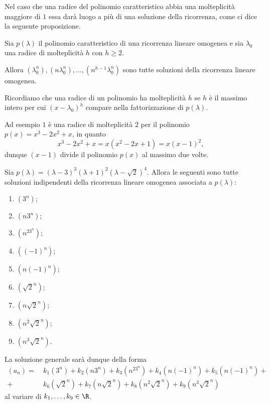 Nel caso che una radice del polinomio caratteristico abbia una molteplicità maggiore di $1$ essa darà luogo a più di una soluzione della ricorrenza, come ci dice la seguente proposizione.
\begin{proposition}
    Sia $p(\lambda)$ il polinomio caratteristico di una ricorrenza lineare omogenea e sia $\lambda_0$ una radice di molteplicità $h$ con $h \geq 2$. 
    
    Allora $(\lambda_0^n), (n\lambda_0^n), \dots, (n^{h-1}\lambda_0^n)$ sono tutte soluzioni della ricorrenza lineare omogenea.
\end{proposition}

\begin{remark}
    Ricordiamo che una radice di un polinomio ha molteplicità $h$ se $h$ è il massimo intero per cui $(x - \lambda_0)^h$ compare nella fattorizzazione di $p(\lambda)$.

    Ad esempio $1$ è una radice di molteplicità $2$ per il polinomio $p(x) = x^3 - 2x^2 + x$, in quanto \[
        x^3 - 2x^2 + x = x(x^2 - 2x + 1) = x(x-1)^2,
    \] dunque $(x-1)$ divide il polinomio $p(x)$ al massimo due volte.
\end{remark}

\begin{example}
    Sia $p(\lambda) = (\lambda - 3)^3(\lambda + 1)^2(\lambda - \sqrt2)^4$. Allora le seguenti sono tutte soluzioni indipendenti della ricorrenza lineare omogenea associata a $p(\lambda)$:
    \begin{multicols}{3}
        \begin{enumerate}[label={(\roman*)}]
        \item $(3^n)$;
        \item $(n3^n)$;
        \item $(n^23^n)$;
        \item $((-1)^n)$;
        \item $(n(-1)^n)$;
        \item $(\sqrt{2}^n)$;
        \item $(n\sqrt{2}^n)$;
        \item $(n^2\sqrt{2}^n)$;
        \item $(n^3\sqrt{2}^n)$.
    \end{enumerate}
    \end{multicols}
    
    La soluzione generale sarà dunque della forma \begin{align*}
        (a_n) = 
            &\ k_1(3^n) + k_2(n3^n) + k_3(n^23^n) + k_4(n(-1)^n) + k_5(n(-1)^n) + \\
            + &\ k_6(\sqrt{2}^n) + k_7(n\sqrt{2}^n) + k_8(n^2\sqrt{2}^n) + k_9(n^3\sqrt{2}^n)
    \end{align*}
    al variare di $k_1, \dots, k_9 \in \R$.
\end{example}